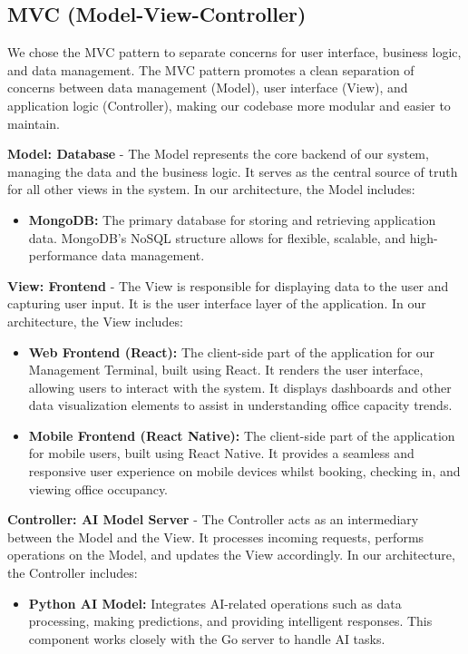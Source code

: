 \documentclass[11pt,a4paper]{article}
\begin{document}
\subsection*{MVC (Model-View-Controller)}
We chose the MVC pattern to separate concerns for user interface, business logic, and data management. The MVC pattern promotes a clean separation of concerns between data management (Model), user interface (View), and application logic (Controller), making our codebase more modular and easier to maintain.

\textbf{Model: Database} - The Model represents the core backend of our system, managing the data and the business logic. It serves as the central source of truth for all other views in the system. In our architecture, the Model includes:
\begin{itemize}
    \item \textbf{MongoDB:} The primary database for storing and retrieving application data. MongoDB's NoSQL structure allows for flexible, scalable, and high-performance data management.
\end{itemize}

\textbf{View: Frontend} - The View is responsible for displaying data to the user and capturing user input. It is the user interface layer of the application. In our architecture, the View includes:
\begin{itemize}
    \item \textbf{Web Frontend (React):} The client-side part of the application for our Management Terminal, built using React. It renders the user interface, allowing users to interact with the system. It displays dashboards and other data visualization elements to assist in understanding office capacity trends.
    \item \textbf{Mobile Frontend (React Native):} The client-side part of the application for mobile users, built using React Native. It provides a seamless and responsive user experience on mobile devices whilst booking, checking in, and viewing office occupancy.
\end{itemize}

\textbf{Controller: AI Model Server} - The Controller acts as an intermediary between the Model and the View. It processes incoming requests, performs operations on the Model, and updates the View accordingly. In our architecture, the Controller includes:
\begin{itemize}
    \item \textbf{Python AI Model:} Integrates AI-related operations such as data processing, making predictions, and providing intelligent responses. This component works closely with the Go server to handle AI tasks.
\end{itemize}
\end{document}
